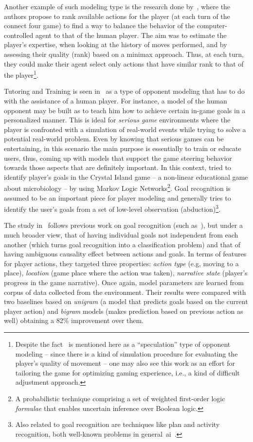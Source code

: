Another example of such modeling type is the research done by~\cite{missura_online_2008}, where the authors propose to rank available actions for the player (at each turn of the connect four game) to find a way to balance the behavior of the computer-controlled agent to that of the human player. The aim was to estimate the player's expertise, when looking at the history of moves performed, and by assessing their quality (rank) based on a minimax approach.  Thus, at each turn, they could make their agent select only actions that have similar rank to that of the player\footnote{Despite the fact~\cite{missura_online_2008} is mentioned here as a ``speculation'' type of opponent modeling -- since there is a kind of simulation procedure for evaluating the player's quality of movement -- one may also see this work as an effort for tailoring the game for optimizing gaming experience, i.e., a kind of difficult adjustment approach.}.

Tutoring and Training is seen in~\cite{herik_opponent_2005} as a type of opponent modeling that has to do with the assistance of a human player. For instance, a model of the human opponent may be built as to teach him how to achieve certain in-game goals in a personalized manner. This is ideal for \textit{serious game} environments where the player is confronted with a simulation of real-world events while trying to solve a potential real-world problem. Even by knowing that serious games can be entertaining, in this scenario the main purpose is essentially to train or educate users, thus, coming up with models that support the game steering behavior towards those aspects that are definitely important. In this context, \cite{ha_goal_2011} tried to identify player's goals in the Crystal Island game -- a non-linear educational game about microbiology -- by using Markov Logic Networks\footnote{A probabilistic technique comprising a set of weighted first-order logic \textit{formulae} that enables uncertain inference over Boolean logic. }. Goal recognition is assumed to be an important piece for player modeling and generally tries to identify the user's goals from a set of low-level observation (abduction)\footnote{Also related to goal recognition are techniques like plan and activity recognition, both well-known problems in general~\gls{ai}~\citep{ha_goal_2011}.}. 

The study in~\cite{ha_goal_2011} follows previous work on goal recognition (such as~\cite{mott_probabilistic_2006}), but under a much broader view, that of having individual goals not independent from each another (which turns goal recognition into a classification problem) and that of having ambiguous causality effect between actions and goals. In terms of features for player actions, they targeted three properties: \textit{action type} (e.g, moving to a place), \textit{location} (game place where the action was taken), \textit{narrative state} (player's progress in the game narrative).  Once again, model parameters are learned from corpus of data collected from the environment. Their results were compared with two baselines based on \textit{unigram} (a model that predicts goals based on the current player action) and \textit{bigram} models (makes prediction based on previous action as well) obtaining a 82\% improvement over them.

